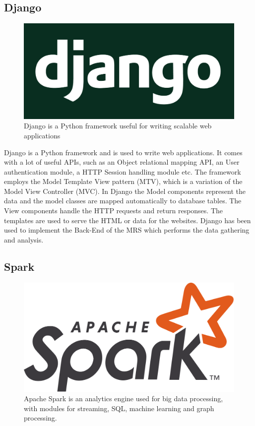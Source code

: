 \subsection{Django}

\begin{figure}[H]
	\centering
	\includegraphics[scale=0.15]{img/django.png}
	\caption{Django is a Python framework useful for writing scalable web applications}
	\label{Literature Review:Django}
\end{figure} 


Django is a Python framework \cite{django} and is used to write web applications. It comes with a lot of useful APIs, such as an Object relational mapping API, an User authentication module, a HTTP Session handling module etc. The framework employs the Model Template View pattern (MTV), which is a variation of the Model View Controller (MVC). In Django the Model components represent the data and the model classes are mapped automatically to database tables. The View components handle the HTTP requests and return responses. The templates are used to serve the HTML or data for the websites. Django has been used to implement the Back-End of the \ac{MRS} which performs the data gathering and analysis.



\subsection{Spark}

\begin{figure}[H]
	\centering
	\includegraphics[scale=0.1]{img/spark.png}
	\caption{Apache Spark is an analytics engine used for big data processing, with modules for streaming, SQL, machine learning and graph processing.}
	\label{Literature Review:Spark}
\end{figure} 


